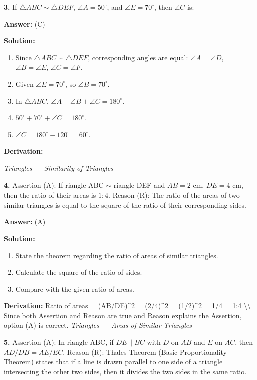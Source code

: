\documentclass[12pt,a4paper]{exam}
\newcommand{\fitmath}[1]{%
  \sbox{\schmathbox}{$\displaystyle #1$}%
  \ifdim\wd\schmathbox>\linewidth
    \resizebox{\linewidth}{!}{\usebox{\schmathbox}}%
  \else
    \usebox{\schmathbox}%
  \fi}
\begin{document}
\begin{questions}
\question \textbf{3.} If $\triangle ABC \sim \triangle DEF$, $\angle A = 50^\circ$, and $\angle E = 70^\circ$, then $\angle C$ is:

\textbf{Answer:}
(C)

\textbf{Solution:}
\begin{enumerate}
  \item Since $\triangle ABC \sim \triangle DEF$, corresponding angles are equal: $\angle A = \angle D$, $\angle B = \angle E$, $\angle C = \angle F$.
  \item Given $\angle E = 70^\circ$, so $\angle B = 70^\circ$.
  \item In $\triangle ABC$, $\angle A + \angle B + \angle C = 180^\circ$.
  \item $50^\circ + 70^\circ + \angle C = 180^\circ$.
  \item $\angle C = 180^\circ - 120^\circ = 60^\circ$.
\end{enumerate}
\textbf{Derivation:}
\begin{center}
\fitmath{\angle C = 180^\circ - (\angle A + \angle B) = 180^\circ - (50^\circ + 70^\circ) = 60^\circ}
\end{center}
\hfill \textit{Triangles — Similarity of Triangles}
\vspace{0.3cm}

\question \textbf{4.} Assertion (A): If 	riangle ABC $\sim$ 	riangle DEF and $AB = 2$ cm, $DE = 4$ cm, then the ratio of their areas is $1:4$. Reason (R): The ratio of the areas of two similar triangles is equal to the square of the ratio of their corresponding sides.

\textbf{Answer:}
(A)

\textbf{Solution:}
\begin{enumerate}
  \item State the theorem regarding the ratio of areas of similar triangles.
  \item Calculate the square of the ratio of sides.
  \item Compare with the given ratio of areas.
\end{enumerate}
\textbf{Derivation:}
 Ratio of areas = (AB/DE)\textasciicircum{}2 = (2/4)\textasciicircum{}2 = (1/2)\textasciicircum{}2 = 1/4 = 1:4 \textbackslash{}\textbackslash{} Since both Assertion and Reason are true and Reason explains the Assertion, option (A) is correct. 
\hfill \textit{Triangles — Areas of Similar Triangles}
\vspace{0.3cm}

\question \textbf{5.} Assertion (A): In $\text{riangle ABC}$, if $DE \parallel BC$ with $D$ on $AB$ and $E$ on $AC$, then $AD/DB = AE/EC$. Reason (R): Thales Theorem (Basic Proportionality Theorem) states that if a line is drawn parallel to one side of a triangle intersecting the other two sides, then it divides the two sides in the same ratio.



\end{questions}
\end{document}
